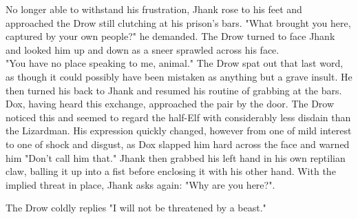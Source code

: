 \documentclass[letterpaper,10pt,twoside,twocolumn,openany]{book}
\begin{document}
No longer able to withstand his frustration, Jhank rose to his feet and approached the Drow still clutching at his prison's bars. "What brought you here, captured by your own people?" he demanded. The Drow turned to face Jhank and looked him up and down as a sneer sprawled across his face.\\


"You have no place speaking to me, animal." The Drow spat out that last word, as though it could possibly have been mistaken as anything but a grave insult. He then turned his back to Jhank and resumed his routine of grabbing at the bars.\\

Dox, having heard this exchange, approached the pair by the door. The Drow noticed this and seemed to regard the half-Elf with considerably less disdain than the Lizardman. His expression quickly changed, however from one of mild interest to one of shock and disgust, as Dox slapped him hard across the face and warned him "Don't call him that." Jhank then grabbed his left hand in his own reptilian claw, balling it up into a fist before enclosing it with his other hand. With the implied threat in place, Jhank asks again: "Why are you here?".

The Drow coldly replies "I will not be threatened by a beast."


\end{document}
